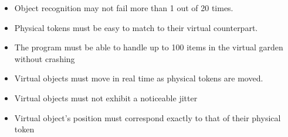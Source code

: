 \begin{itemize}
	\item Object recognition may not fail more than 1 out of 20 times.
	\item Physical tokens must be easy to match to their virtual counterpart.
	\item The program must be able to handle up to 100 items in the virtual garden without crashing
	
	\item Virtual objects must move in real time as physical tokens are moved.
	\item Virtual objects must not exhibit a noticeable jitter
	\item Virtual object's position must correspond exactly to that of their physical token
\end{itemize}
